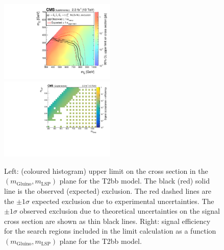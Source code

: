 \begin{figure}[t]
  \begin{center}
    \includegraphics[width=0.49\textwidth]{RA1T2bbXSEC_aux} \, 
    \includegraphics[width=0.49\textwidth]{T2bb_merging_4_cats_aux} \,     
  \end{center}
  \caption{Left: (coloured histogram) upper limit on the cross section in the $(m_{\mathrm{Gluino}},m_{\mathrm{LSP}})$ plane for the T2bb model. 
  The black (red) solid line is the observed (expected) exclusion. The red dashed lines are the $\pm1\sigma$ expected exclusion due to experimental uncertainties. 
  The $\pm1\sigma$ observed exclusion due to theoretical uncertainties on the signal cross section are shown as thin black lines. 
  Right: signal efficiency for the search regions included in the limit calculation as a function $(m_{\mathrm{Gluino}},m_{\mathrm{LSP}})$ plane for the T2bb model. 
  \label{fig:T2bb_excl}}
\end{figure}


